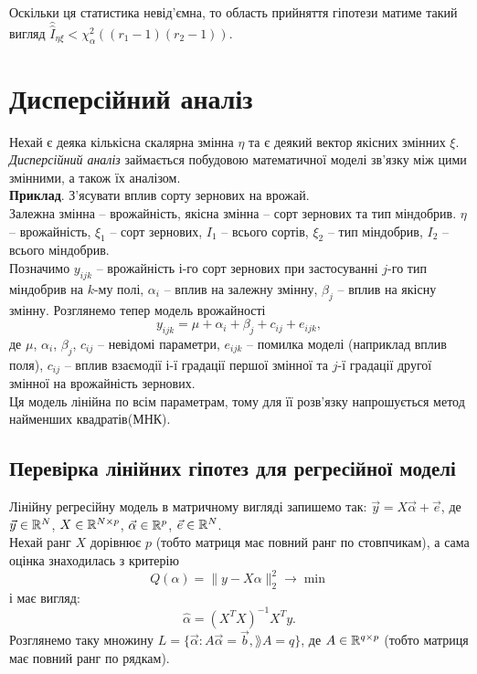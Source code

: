 Оскільки ця статистика невід'ємна, то область прийняття гіпотези матиме такий вигляд $\widehat{\widehat{I}}_{\eta\xi} < \chi^2_\alpha((r_1-1)(r_2-1))$.
\section{Дисперсійний аналіз}
Нехай є деяка кількісна скалярна змінна $\eta$ та є деякий вектор якісних змінних $\xi$. \\

\textit{Дисперсійний аналіз} займається побудовою математичної моделі зв'язку між цими змінними, а також їх аналізом. \\

\textbf{Приклад}. З'ясувати вплив сорту зернових на врожай. \\

Залежна змінна -- врожайність, якісна змінна -- сорт зернових та тип міндобрив. $\eta$ -- врожайність, $\xi_1$ -- сорт зернових, $I_1$ -- всього сортів, $\xi_2$ -- тип міндобрив, $I_2$ -- всього міндобрив. \\

Позначимо $y_{ijk}$ -- врожайність $і$-го сорт зернових при застосуванні $j$-го тип міндобрив на $k$-му полі, $\alpha_i$ -- вплив на залежну змінну, $\beta_j$ -- вплив на якісну змінну. Розглянемо тепер модель врожайності \[y_{ijk}=\mu+\alpha_i+\beta_j+c_{ij}+e_{ijk},\] 
де $\mu$, $\alpha_i$, $\beta_j$, $c_{ij}$ -- невідомі параметри, $e_{ijk}$ -- помилка моделі (наприклад вплив поля), $c_{ij}$ -- вплив взаємодії $і$-ї градації першої змінної та $j$-ї градації другої змінної на врожайність зернових. \\

Ця модель лінійна по всім параметрам, тому для її розв'язку напрошується метод найменших квадратів(МНК).
\subsection{Перевірка лінійних гіпотез для регресійної моделі}
Лінійну регресійну модель в матричному вигляді запишемо так: $\vec y = X \vec \alpha + \vec e$, де $\vec y\in\mathbb{R}^N$, $X\in\mathbb{R}^{N\times p}$, $\vec\alpha\in\mathbb{R}^p$, $\vec e\in\mathbb{R}^N$. \\

Нехай ранг $X$ дорівнює $p$ (тобто матриця має повний ранг по стовпчикам), а сама оцінка знаходилась з критерію \[Q(\alpha)=\|y-X\alpha\|_2^2\to\min\] і має вигляд: \[\widehat \alpha = (X^TX)^{-1}X^Ty.\]
Розглянемо таку множину $L = \{\vec\alpha : A\vec\alpha = \vec b, \rang  A = q\}$, де $A \in \mathbb{R}^{q\times p}$ (тобто матриця має повний ранг по рядкам). \\

